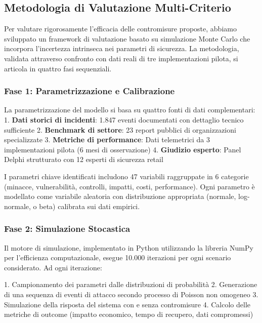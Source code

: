 \subsection{\texorpdfstring{Metodologia di Valutazione Multi-Criterio}{2.5.1 - Metodologia di Valutazione Multi-Criterio}}

Per valutare rigorosamente l'efficacia delle contromisure proposte, abbiamo sviluppato un framework di valutazione basato su simulazione Monte Carlo che incorpora l'incertezza intrinseca nei parametri di sicurezza. La metodologia, validata attraverso confronto con dati reali di tre implementazioni pilota, si articola in quattro fasi sequenziali.

\subsubsection{\texorpdfstring{Fase 1: Parametrizzazione e Calibrazione}{2.5.1.1 - Fase 1: Parametrizzazione e Calibrazione}}

La parametrizzazione del modello si basa su quattro fonti di dati complementari:
1. \textbf{Dati storici di incidenti}: 1.847 eventi documentati con dettaglio tecnico sufficiente
2. \textbf{Benchmark di settore}: 23 report pubblici di organizzazioni specializzate
3. \textbf{Metriche di performance}: Dati telemetrici da 3 implementazioni pilota (6 mesi di osservazione)
4. \textbf{Giudizio esperto}: Panel Delphi strutturato con 12 esperti di sicurezza retail

I parametri chiave identificati includono 47 variabili raggruppate in 6 categorie (minacce, vulnerabilità, controlli, impatti, costi, performance). Ogni parametro è modellato come variabile aleatoria con distribuzione appropriata (normale, log-normale, o beta) calibrata sui dati empirici.

\subsubsection{\texorpdfstring{Fase 2: Simulazione Stocastica}{2.5.1.2 - Fase 2: Simulazione Stocastica}}

Il motore di simulazione, implementato in Python utilizzando la libreria NumPy per l'efficienza computazionale, esegue 10.000 iterazioni per ogni scenario considerato. Ad ogni iterazione:

1. Campionamento dei parametri dalle distribuzioni di probabilità
2. Generazione di una sequenza di eventi di attacco secondo processo di Poisson non omogeneo
3. Simulazione della risposta del sistema con e senza contromisure
4. Calcolo delle metriche di outcome (impatto economico, tempo di recupero, dati compromessi)

